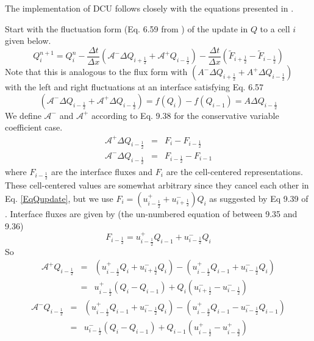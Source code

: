 The implementation of DCU follows closely with the equations presented in
\cite{LeVeque03}.

Start with the fluctuation form (Eq. 6.59 from \cite{LeVeque03}) of the update in $Q$ to
a cell $i$ given below.
\begin{equation}\label{EqQupdate}
Q^{n+1}_i = Q^{n}_i - \frac{\Delta t}{\Delta x} 
\left( \mathcal{A}^{-} \Delta Q_{i+\frac{1}{2}} + \mathcal{A}^{+} Q_{i-\frac{1}{2}}\right) -
\frac{\Delta t}{\Delta x}
\left( \widetilde{F}_{i+\frac{1}{2}} - \widetilde{F}_{i-\frac{1}{2}}\right)
\end{equation}
Note that this is analogous to the flux form with
$(A^{-}\Delta Q_{i+\frac{1}{2}} + A^{+}\Delta Q_{i-\frac{1}{2}})$ with the left and
right fluctuations at an interface satisfying Eq. 6.57 
\begin{equation}\label{Eqflucdef}
(\mathcal{A}^{-}\Delta Q_{i-\frac{1}{2}} + \mathcal{A}^{+}\Delta Q_{i-\frac{1}{2}})=
f(Q_i)-f(Q_{i-1})= A \Delta Q_{i-\frac{1}{2}}
\end{equation}
We define $\mathcal{A}^{-}$ and $\mathcal{A}^{+}$ according to Eq. 9.38 for the
conservative variable coefficient case.
\begin{eqnarray}
\mathcal{A}^{+} \Delta Q_{i-\frac{1}{2}} &=& F_i - F_{i-\frac{1}{2}} \\
\mathcal{A}^{-} \Delta Q_{i-\frac{1}{2}} &=& F_{i-\frac{1}{2}} - F_{i-1}
\end{eqnarray}
where $F_{i-\frac{1}{2}}$ are the interface fluxes and $F_i$ are the cell-centered
representations.  These cell-centered values are somewhat arbitrary since they cancel
each other in Eq. \ref{EqQupdate}, but we use
$F_i = (u^{+}_{i-\frac{1}{2}} + u^{-}_{i+\frac{1}{2}})Q_i$ as suggested by
Eq 9.39 of \cite{LeVeque03}.  Interface fluxes are given by (the un-numbered
equation of \cite{LeVeque03} between 9.35 and 9.36)
\begin{equation}\label{Eqfluxdef}
F_{i-\frac{1}{2}} = u^{+}_{i-\frac{1}{2}} Q_{i-1} + u^{-}_{i-\frac{1}{2}} Q_{i}
\end{equation}
So
\begin{eqnarray}
\mathcal{A}^{+} Q_{i-\frac{1}{2}} &=&  
  \left( u^{+}_{i-\frac{1}{2}} Q_{i}   + u^{-}_{i+\frac{1}{2}} Q_{i} \right) -
  \left( u^{+}_{i-\frac{1}{2}} Q_{i-1} + u^{-}_{i-\frac{1}{2}} Q_{i} \right) \\
                                  &=& 
 u^{+}_{i-\frac{1}{2}} \left( Q_{i} - Q_{i-1} \right) +
                 Q_{i} \left( u^{-}_{i+\frac{1}{2}} - u^{-}_{i-\frac{1}{2}}  \right)
\end{eqnarray}
\begin{eqnarray}
\mathcal{A}^{-} Q_{i-\frac{1}{2}} &=&  
  \left( u^{+}_{i-\frac{1}{2}} Q_{i-1} + u^{-}_{i-\frac{1}{2}} Q_{i}   \right) -
  \left( u^{+}_{i-\frac{3}{2}} Q_{i-1} - u^{-}_{i-\frac{1}{2}} Q_{i-1} \right) \\
                                  &=& 
  u^{-}_{i-\frac{1}{2}} \left( Q_{i} - Q_{i-1} \right) +
                Q_{i-1} \left( u^{+}_{i-\frac{1}{2}} - u^{+}_{i-\frac{3}{2}}  \right)
\end{eqnarray}

